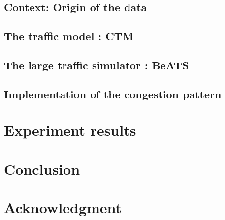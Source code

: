 \subsection{Context: Origin of the data}
\label{subsec:pems}

\subsection{The traffic model : CTM}
\label{ctm}

\subsection{The large traffic simulator : BeATS}
\label{subsec:beats}

\subsection{Implementation of the congestion pattern}
\label{subsec:cpimplementation}







\section{Experiment results}
\label{sec:results_intro}


\section{Conclusion}


\section*{Acknowledgment}



\label{sec:appendix}






%


